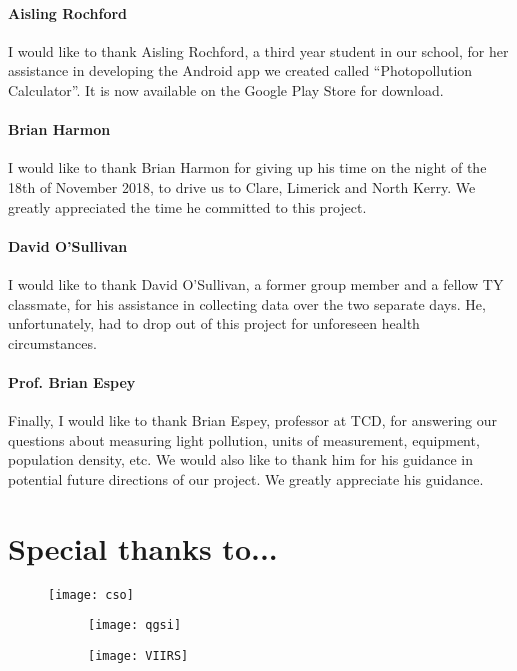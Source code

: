 \paragraph{Aisling Rochford}
I would like to thank Aisling Rochford, a third year student in our school, for her assistance in developing the Android app we created called “Photopollution Calculator”. It is now available on the Google Play Store for download. 
\paragraph{Brian Harmon}
I would like to thank Brian Harmon for giving up his time on the night of the 18th of November 2018, to drive us to Clare, Limerick and North Kerry. We greatly appreciated the time he committed to this project.
\paragraph{David O'Sullivan}
I would like to thank David O'Sullivan, a former group member and a fellow TY classmate, for his assistance in collecting data over the two separate days. He, unfortunately, had to drop out of this project for unforeseen health circumstances. 
\paragraph{Prof. Brian Espey}
Finally, I would like to thank Brian Espey, professor at TCD, for answering our questions about measuring light pollution, units of measurement, equipment, population density, etc. We would also like to thank him for his guidance in potential future directions of our project. We greatly appreciate his guidance.

\section*{Special thanks to...}
\begin{figure}[H]
    \centering
    \texttt{[image: cso]}
\end{figure}
\begin{figure}[H]
    \centering
    \begin{subfigure}{.49\linewidth}
        \centering
        \texttt{[image: qgsi]}
    \end{subfigure}
    \hfill
    \begin{subfigure}{.49\linewidth}
        \centering
        \texttt{[image: VIIRS]}
    \end{subfigure}
\end{figure}